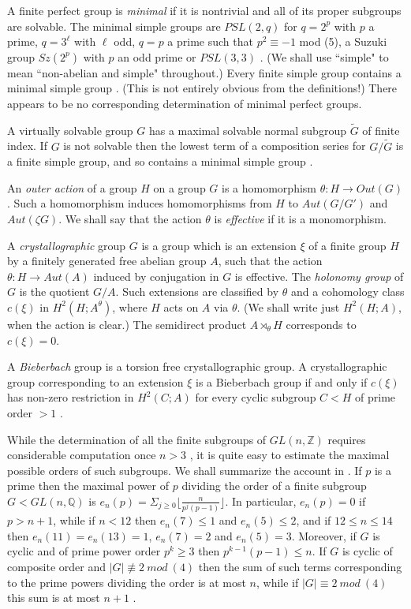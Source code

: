 \documentclass[12pt]{amsart}
\renewcommand{\geq}{\geqslant}
\renewcommand{\leq}{\leqslant}
\begin{document}
A finite perfect group is {\it minimal\/} if it is nontrivial and
all of its proper subgroups are solvable.
The minimal simple groups are $PSL(2,q)$ for $q=2^p$ with $p$ a prime,
$q=3^\ell$ with $\ell$ odd, $q=p$ a prime such that $p^2\equiv-1$ mod (5),
a Suzuki group $Sz(2^p)$ with $p$ an odd prime or $PSL(3,3)$ \cite{Th}.
(We shall use ``simple"  to mean ``non-abelian and simple" throughout.)
Every finite simple group contains a minimal simple group \cite{BW}.
(This is not entirely obvious from the definitions!)
There appears to be no corresponding determination of minimal perfect groups.

A virtually solvable group $G$ has a maximal solvable normal subgroup 
$\widetilde{G}$ of finite index.
If $G$ is not solvable then the lowest term of a composition series 
for $G/\widetilde{G}$ is a finite simple group, 
and so contains a minimal simple group \cite{BW}.

An {\it outer action\/} of a group $H$ on a group $G$ 
is a homomorphism $\theta:H\to{Out(G)}$.
Such a homomorphism induces homomorphisms from $H$ to $Aut(G/G')$ 
and $Aut(\zeta{G})$.
We shall say that the action $\theta$ is {\it effective\/} if it is a monomorphism.

A {\it crystallographic\/} group $G$ is a group which is an extension $\xi$
of a finite group $H$ by a finitely generated free abelian group $A$, 
such that the action $\theta:H\to{Aut(A)}$ induced by conjugation 
in $G$ is effective.
The {\it holonomy group\/} of $G$ is the quotient $G/A$.
Such extensions are classified by $\theta$ and a cohomology class
$c(\xi)$ in $H^2(H;A^\theta)$, where $H$ acts on $A$ via $\theta$.
(We shall write just $H^2(H;A)$, when the action is clear.)
The semidirect product $A\rtimes_\theta{H}$ corresponds to $c(\xi)=0$.

A {\it Bieberbach\/} group is a torsion free crystallographic group.
A crystallographic group corresponding to an extension $\xi$
is a Bieberbach group if and only if  $c(\xi)$ has non-zero restriction
in $H^2(C;A)$ for every cyclic subgroup $C<H$ of prime order $>1$
\cite[Theorem 3.1]{Sz}.

While the determination of all the finite subgroups of $GL(n,\mathbb{Z})$
requires considerable computation once $n>3$ \cite{CS,PP},
it is quite easy to estimate the maximal possible orders of such subgroups.
We shall summarize the account in \cite{KP}.
If $p$ is a prime then the maximal power of $p$ dividing the order 
of a finite subgroup $G<GL(n,\mathbb{Q})$ is  
$e_n(p)=\Sigma_{j\geq0}\lfloor{\frac{n}{p^j(p-1)}}\rfloor$.
In particular,  $e_n(p)=0$ if $p>n+1$,
while if $n<12$ then $e_n(7)\leq1$ and $e_n(5)\leq2$,
and if $12\leq{n}\leq14$ then $e_n(11)=e_n(13)=1$, 
$e_n(7)=2$ and $e_n(5)=3$.
Moreover, if $G$ is cyclic and of prime power order $p^k\geq3$ then 
$p^{k-1}(p-1)\leq{n}$.
If $G$ is cyclic of composite order and $|G|\not\equiv2~mod~(4)$ then the sum 
of such terms corresponding to the prime powers dividing the order is at most $n$, 
while if $|G|\equiv2~mod~(4)$ this sum is at most $n+1$ \cite{KP}.
\end{document}
